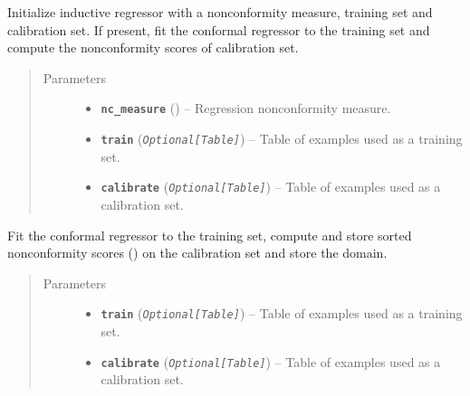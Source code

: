 \documentclass[letterpaper,10pt,english]{sphinxmanual}
\begin{document}
\begin{fulllineitems}
\begin{fulllineitems}
\label{cp.regression:cp.regression.InductiveRegressor.__init__}
Initialize inductive regressor with a nonconformity measure, training set and calibration set.
If present, fit the conformal regressor to the training set and compute the nonconformity scores of
calibration set.
\begin{quote}\begin{description}
\item[{Parameters}] \leavevmode\begin{itemize}
\item {} 
\textbf{\texttt{nc\_measure}} ({\hyperref[cp.nonconformity:cp.nonconformity.RegrNC]{}}) -- Regression nonconformity measure.

\item {} 
\textbf{\texttt{train}} (\emph{\texttt{Optional{[}Table{]}}}) -- Table of examples used as a training set.

\item {} 
\textbf{\texttt{calibrate}} (\emph{\texttt{Optional{[}Table{]}}}) -- Table of examples used as a calibration set.

\end{itemize}

\end{description}\end{quote}

\end{fulllineitems}


\begin{fulllineitems}
\label{cp.regression:cp.regression.InductiveRegressor.fit}
Fit the conformal regressor to the training set, compute and store sorted nonconformity scores ({\hyperref[cp.regression:cp.regression.InductiveRegressor.alpha]{}})
on the calibration set and store the domain.
\begin{quote}\begin{description}
\item[{Parameters}] \leavevmode\begin{itemize}
\item {} 
\textbf{\texttt{train}} (\emph{\texttt{Optional{[}Table{]}}}) -- Table of examples used as a training set.

\item {} 
\textbf{\texttt{calibrate}} (\emph{\texttt{Optional{[}Table{]}}}) -- Table of examples used as a calibration set.

\end{itemize}

\end{description}\end{quote}

\end{fulllineitems}


\end{fulllineitems}
\end{document}
